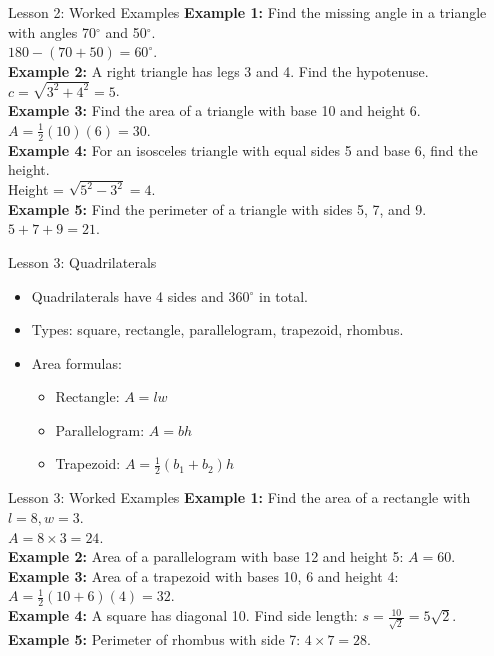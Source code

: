 \documentclass{beamer}
\begin{document}
\begin{frame}{Lesson 2: Worked Examples}
\textbf{Example 1:} Find the missing angle in a triangle with angles 70$^\circ$ and 50$^\circ$.\\
$180 - (70 + 50) = 60^\circ$.\\[1em]
\textbf{Example 2:} A right triangle has legs 3 and 4. Find the hypotenuse.\\
$c = \sqrt{3^2 + 4^2} = 5$.\\[1em]
\textbf{Example 3:} Find the area of a triangle with base 10 and height 6.\\
$A = \tfrac{1}{2}(10)(6) = 30$.\\[1em]
\textbf{Example 4:} For an isosceles triangle with equal sides 5 and base 6, find the height.\\
Height = $\sqrt{5^2 - 3^2} = 4$.\\[1em]
\textbf{Example 5:} Find the perimeter of a triangle with sides 5, 7, and 9.\\
$5 + 7 + 9 = 21$.
\end{frame}

\begin{frame}{Lesson 3: Quadrilaterals}
\begin{itemize}
  \item Quadrilaterals have 4 sides and 360$^\circ$ in total.
  \item Types: square, rectangle, parallelogram, trapezoid, rhombus.
  \item Area formulas:
    \begin{itemize}
      \item Rectangle: $A = lw$
      \item Parallelogram: $A = bh$
      \item Trapezoid: $A = \tfrac{1}{2}(b_1 + b_2)h$
    \end{itemize}
\end{itemize}
\end{frame}

\begin{frame}{Lesson 3: Worked Examples}
\textbf{Example 1:} Find the area of a rectangle with $l=8, w=3$.\\
$A = 8 \times 3 = 24$.\\[1em]
\textbf{Example 2:} Area of a parallelogram with base 12 and height 5: $A = 60$.\\[1em]
\textbf{Example 3:} Area of a trapezoid with bases 10, 6 and height 4: $A = \tfrac{1}{2}(10+6)(4) = 32$.\\[1em]
\textbf{Example 4:} A square has diagonal 10. Find side length: $s = \tfrac{10}{\sqrt{2}} = 5\sqrt{2}$.\\[1em]
\textbf{Example 5:} Perimeter of rhombus with side 7: $4 \times 7 = 28$.
\end{frame}
\end{document}
